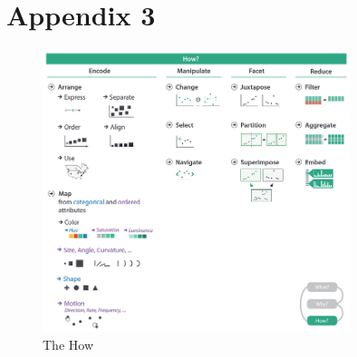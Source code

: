 \section{Appendix 3} \label{app:www-how}

\begin{figure}[h]
  \centering
  \includegraphics[width=0.8\textwidth]{Images/www/how.png}
  \caption{The How}
  \label{fig:www-how}
\end{figure}

\newpage